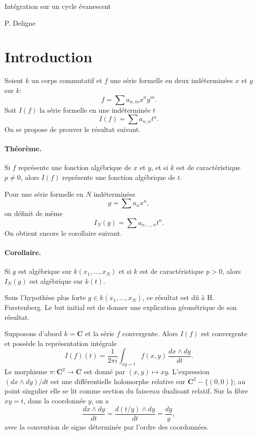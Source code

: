 \documentclass[11pt]{article}
\newcommand{\C}{\mathbf C}
\begin{document}
\begin{center}
{\Large Intégration sur un cycle évanescent}\par
\vspace{0.5em}
{P. Deligne}\par
\end{center}

\section*{Introduction}

Soient $k$ un corps commutatif et $f$ une série formelle en deux indéterminées $x$ et $y$ sur $k$:
\[
 f=\sum a_{n,m}x^ny^m.
\]
Soit $I(f)$ la série formelle en une indéterminée $t$
\[
 I(f)=\sum a_{n,n}t^n.
\]
On se propose de prouver le résultat suivant.

\paragraph{Théorème.} Si $f$ représente une fonction algébrique de $x$ et $y$, et si $k$ est de caractéristique $p\ne0$, alors $I(f)$ représente une fonction algébrique de $t$.

Pour une série formelle en $N$ indéterminées
\[
 g=\sum a_nx^n,
\]
on définit de même
\[
 I_N(g)=\sum a_{n,\ldots,n}t^n.
\]
On obtient encore le corollaire suivant.

\paragraph{Corollaire.} Si $g$ est algébrique sur $k(x_1,\ldots,x_N)$ et si $k$ est de caractéristique $p>0$, alors $I_N(g)$ est algébrique sur $k(t)$.

Sous l'hypothèse plus forte $g\in k(x_1,
\ldots,x_N)$, ce résultat est dû à H. Furstenberg. Le but initial est de donner une explication géométrique de son résultat.

Supposons d'abord $k=\C$ et la série $f$ convergente. Alors $I(f)$ est convergente et possède la représentation intégrale
\begin{equation}\tag{1}
 I(f)(t)=\frac1{2\pi i}\int_{xy=t} f(x,y)\,\frac{dx\wedge dy}{dt}.
\end{equation}
Le morphisme $\pi:\C^2\to\C$ est donné par $(x,y)\mapsto xy$. L'expression $(dx\wedge dy)/dt$ est une différentielle holomorphe relative sur $\C^2-\{(0,0)\}$; au point singulier elle se lit comme section du faisceau dualisant relatif. Sur la fibre $xy=t$, dans la coordonnée $y$, on a
\[
 \frac{dx\wedge dy}{dt}=\frac{d(t/y)\wedge dy}{dt}=\frac{dy}{y},
\]
avec la convention de signe déterminée par l'ordre des coordonnées.
\end{document}
